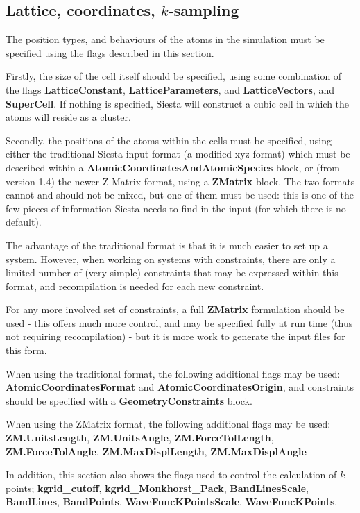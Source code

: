 \documentclass[11pt]{article}
\begin{document}
\vspace{5pt}
\subsection{Lattice, coordinates, $k$-sampling}

The position types, and behaviours of the atoms in the simulation
must be specified using the flags described in this section.

Firstly, the size of the cell itself should be specified, using
some combination of the flags
\textbf{LatticeConstant}, \textbf{LatticeParameters},
and \textbf{LatticeVectors}, and \textbf{SuperCell}.
If nothing is specified, {\sc Siesta} will construct a cubic
cell in which the atoms will reside as a cluster.

Secondly, the positions of the atoms within the cells
must be specified, using either the traditional {\sc Siesta}
input format (a modified xyz format) which must be described 
within
a \textbf{AtomicCoordinatesAndAtomicSpecies} block, or 
(from version 1.4) the newer Z-Matrix format, using a
\textbf{ZMatrix} block. The two formats cannot and
should not be mixed, but one of them must be used: 
this is one of the few pieces of information {\sc Siesta}
needs to find in the input (for which there is no default).

The advantage of the traditional format is that it is
much easier to set up a system. However, when working
on systems with constraints, there are only a limited
number of (very simple) constraints that may be expressed
within this format, and recompilation is needed for each
new constraint. 

For any more involved set of constraints, a 
full \textbf{ZMatrix} formulation should be used - this
offers much more control, and may be specified fully at
run time (thus not requiring recompilation) - but
it is more work to generate the input files for this form.

When using the traditional format, the following additional
flags may be used: \textbf{AtomicCoordinatesFormat} and
\textbf{AtomicCoordinatesOrigin}, and constraints should
be specified with a \textbf{GeometryConstraints} block.

When using the ZMatrix format, the following additional flags
may be used: \textbf{ZM.UnitsLength}, \textbf{ZM.UnitsAngle},
\textbf{ZM.ForceTolLength}, \textbf{ZM.ForceTolAngle}, 
\textbf{ZM.MaxDisplLength}, \textbf{ZM.MaxDisplAngle}

In addition, this section also shows the flags used to control
the calculation of $k$-points; \textbf{kgrid\_cutoff},
\textbf{kgrid\_Monkhorst\_Pack}, \textbf{BandLinesScale},
\textbf{BandLines}, \textbf{BandPoints},
\textbf{WaveFuncKPointsScale}, \textbf{WaveFuncKPoints}.
\end{document}
